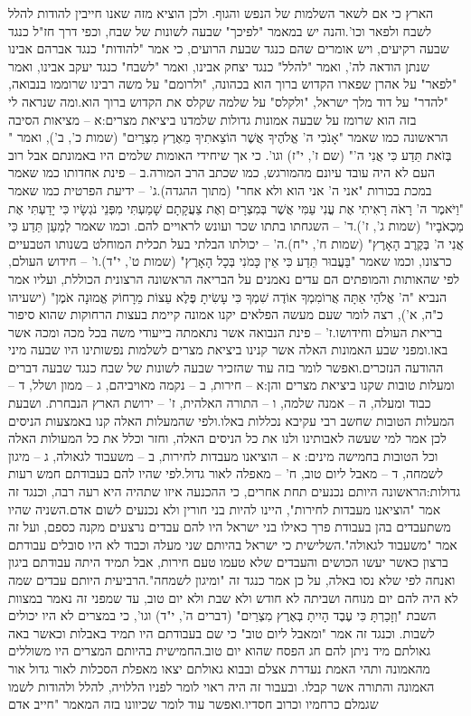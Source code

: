 \documentclass[12pt, openany]{book}
\begin{document}
הארץ כי אם לשאר השלמות של הנפש והגוף. ולכן הוציא מזה שאנו חייבין להודות להלל לשבח ולפאר וכו'.והנה יש במאמר "לפיכך" שבעה לשונות של שבח, וכפי דרך חז"ל כנגד שבעה רקיעים, ויש אומרים שהם כנגד שבעת הרועים, כי אמר "להודות" כנגד אברהם אבינו שנתן הודאה לה', ואמר "להלל" כנגד יצחק אבינו, ואמר "לשבח" כנגד יעקב אבינו, ואמר "לפאר" על אהרן שפארו הקדוש ברוך הוא בכהונה, "ולרומם" על משה רבינו שרוממו בנבואה, "להדר" על דוד מלך ישראל, "ולקלס" על שלמה שקלס את הקדוש ברוך הוא.ומה שנראה לי בזה הוא שרומז על שבעה אמונות גדולות שלמדנו ביציאת מצרים:א – מציאות הסיבה הראשונה כמו שאמר "אָנֹכִי ה' אֱלֹהֶיךָ אֲשֶׁר הוֹצֵאתִיךָ מֵאֶרֶץ מִצְרַיִם" (שמות כ', ב'), ואמר " בְּזֹאת תֵּדַע כִּי אֲנִי ה'" (שם ז', י"ז) וגו'. כי אך שיחידי האומות שלמים היו באמונתם אבל רוב העם לא היה עובד עיונם מהמורגש, כמו שכתב הרב המורה.ב – פינת אחדותו כמו שאמר במכת בכורות "אני ה' אני הוא ולא אחר" (מתוך ההגדה).ג' – ידיעת הפרטית כמו שאמר "וַיֹּאמֶר ה' רָאֹה רָאִיתִי אֶת עֳנִי עַמִּי אֲשֶׁר בְּמִצְרָיִם וְאֶת צַעֲקָתָם שָׁמַעְתִּי מִפְּנֵי נֹגְשָׂיו כִּי יָדַעְתִּי אֶת מַכְאֹבָיו" (שמות ג', ז').ד' – השגחתו בתתו שכר ועונש לראויים להם. וכמו שאמר  לְמַעַן תֵּדַע כִּי אֲנִי ה' בְּקֶרֶב הָאָרֶץ" (שמות ח', י"ח).ה' – יכולתו הבלתי בעל תכלית המוחלט בשנותו הטבעיים כרצונו, וכמו שאמר "בַּעֲבוּר תֵּדַע כִּי אֵין כָּמֹנִי בְּכָל הָאָרֶץ" (שמות ט', י"ד).ו' – חידוש העולם, לפי שהאותות והמופתים הם עדים נאמנים על הבריאה הראשונה הרצונית הכוללת, ועליו אמר הנביא "ה' אֱלֹהַי אַתָּה אֲרוֹמִמְךָ אוֹדֶה שִׁמְךָ כִּי עָשִׂיתָ פֶּלֶא עֵצוֹת מֵרָחוֹק אֱמוּנָה אֹמֶן" (ישעיהו כ"ה, א'), רצה לומר שעם מעשה הפלאים יקנו אמונה קיימת בעצות הרחוקות שהוא סיפור בריאת העולם וחידושו.ז' – פינת הנבואה אשר נתאמתה בייעודי משה בכל מכה ומכה אשר באו.ומפני שבע האמונות האלה אשר קנינו ביציאת מצרים לשלמות נפשותינו היו שבעה מיני ההודעה הנזכרים.ואפשר לומר בזה עוד שהזכיר שבעה לשונות של שבח כנגד שבעה דברים ומעלות טובות שקנו ביציאת מצרים והן:א – חירות, ב – נקמה מאויביהם, ג – ממון ושלל, ד – כבוד ומעלה, ה – אמנה שלמה, ו – התורה האלהית, ז' – ירושת הארץ הנבחרת. ושבעת המעלות הטובות שחשב רבי עקיבא נכללות באלו.ולפי שהמעלות האלה קנו באמצעות הניסים לכן אמר למי שעשה לאבותינו ולנו את כל הניסים האלה, וחזר וכלל את כל המעולות האלה וכל הטובות בחמישה מינים: א – הוציאנו מעבדות לחירות, ב – משעבוד לגאולה, ג – מיגון לשמחה, ד – מאבל ליום טוב, ח' – מאפלה לאור גדול.לפי שהיו להם בעבודתם חמש רעות גדולות:הראשונה היותם נכנעים תחת אחרים, כי ההכנעה איזו שתהיה היא רעה רבה, וכנגד זה אמר "הוציאנו מעבדות לחירות", היינו להיות בני חורין ולא נכנעים לשום אדם.השניה שהיו משתעבדים בהן בעבודת פרך כאילו בני ישראל היו להם עבדים נרצעים מקנה כספם, ועל זה אמר "משעבוד לגאולה".השלישית כי ישראל בהיותם שני מעלה וכבוד לא היו סובלים עבודתם ברצון כאשר יעשו הכושים והעבדים שלא טעמו טעם חירות, אבל תמיד היתה עבודתם ביגון ואנחה לפי שלא נסו באלה, על כן אמר כנגד זה "ומיגון לשמחה".הרביעית היותם עבדים שמה לא היה להם יום מנוחה ושביתה לא חודש ולא שבת ולא יום טוב, עד שמפני זה נאמר במצוות השבת "וְזָכַרְתָּ כִּי עֶבֶד הָיִיתָ בְּאֶרֶץ מִצְרַיִם" (דברים ה', י"ד) וגו', כי במצרים לא היו יכולים לשבות. וכנגד זה אמר "ומאבל ליום טוב" כי שם בעבודתם היו תמיד באבלות וכאשר באה גאולתם מיד ניתן להם חג הפסח שהוא יום טוב.החמישית בהיותם המצרים היו משוללים מהאמונה ותהי האמת נעדרת אצלם ובבוא גאולתם יצאו מאפלת הסכלות לאור גדול אור האמונה והתורה אשר קבלו. ובעבור זה היה ראוי לומר לפניו הללויה, להלל ולהודות לשמו שגמלם כרחמיו וכרוב חסדיו.ואפשר עוד לומר שכיוונו בזה המאמר "חייב אדם 
\end{document}
